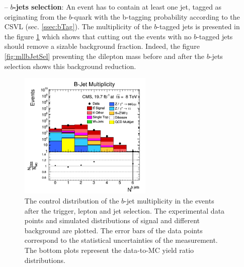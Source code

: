 \begin{itemize}
%  
 \item [--] \textbf{$b$-jets selection}: An event has to contain at least one jet, tagged as originating from the $b$-quark with the b-tagging probability according to the CSVL (sec. \ref{ssec:bTag}). The multiplicity of the $b$-tagged
 jets is presented in the figure \ref{fig:bjetMultiSel} which shows that cutting out the events with no $b$-tagged jets should remove a sizable background fraction. Indeed, the figure \ref{fig:mllbJetSel} presenting
 the dilepton mass before and after the $b$-jets selection shows this background reduction.
 
 \begin{figure}[h]
  \centering
  \includegraphics[width=0.6\textwidth]{04_event_reconstruction/plots/bJetMulti.png}
  \caption{The control distribution of the $b$-jet multiplicity in the events after the trigger, lepton and jet selection. The experimental data points
  and simulated distributions of signal and different background are plotted. The error bars of the data points
  correspond to the statistical uncertainties of the measurement. The bottom plots represent the data-to-MC yield ratio distributions.}
  \label{fig:bjetMultiSel}
  \end{figure}
  

\end{itemize}

